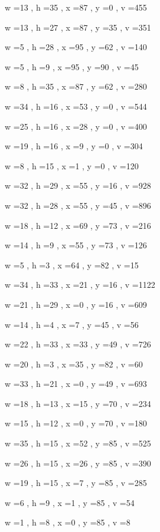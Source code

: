 \documentclass[11pt]{article}
\begin{document}
w =13 , h =35 , x =87 , y =0 , v =455
\par
w =13 , h =27 , x =87 , y =35 , v =351
\par
w =5 , h =28 , x =95 , y =62 , v =140
\par
w =5 , h =9 , x =95 , y =90 , v =45
\par
w =8 , h =35 , x =87 , y =62 , v =280
\par
w =34 , h =16 , x =53 , y =0 , v =544
\par
w =25 , h =16 , x =28 , y =0 , v =400
\par
w =19 , h =16 , x =9 , y =0 , v =304
\par
w =8 , h =15 , x =1 , y =0 , v =120
\par
w =32 , h =29 , x =55 , y =16 , v =928
\par
w =32 , h =28 , x =55 , y =45 , v =896
\par
w =18 , h =12 , x =69 , y =73 , v =216
\par
w =14 , h =9 , x =55 , y =73 , v =126
\par
w =5 , h =3 , x =64 , y =82 , v =15
\par
w =34 , h =33 , x =21 , y =16 , v =1122
\par
w =21 , h =29 , x =0 , y =16 , v =609
\par
w =14 , h =4 , x =7 , y =45 , v =56
\par
w =22 , h =33 , x =33 , y =49 , v =726
\par
w =20 , h =3 , x =35 , y =82 , v =60
\par
w =33 , h =21 , x =0 , y =49 , v =693
\par
w =18 , h =13 , x =15 , y =70 , v =234
\par
w =15 , h =12 , x =0 , y =70 , v =180
\par
w =35 , h =15 , x =52 , y =85 , v =525
\par
w =26 , h =15 , x =26 , y =85 , v =390
\par
w =19 , h =15 , x =7 , y =85 , v =285
\par
w =6 , h =9 , x =1 , y =85 , v =54
\par
w =1 , h =8 , x =0 , y =85 , v =8
\par
\newpage
\end{document}
